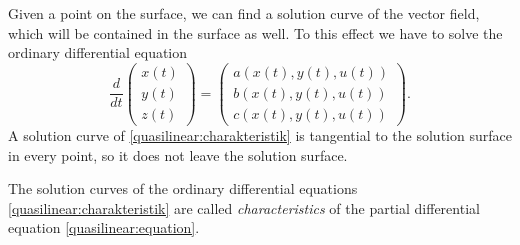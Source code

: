 Given a point on the surface, we can find a solution curve of the vector
field, which will be contained in the surface as well.
To this effect we have to solve the ordinary differential equation
\begin{equation}
\frac{d}{dt}\begin{pmatrix}x(t)\\y(t)\\z(t)\end{pmatrix}
=
\begin{pmatrix}
a(x(t),y(t),u(t))\\b(x(t),y(t),u(t))\\c(x(t),y(t),u(t))
\end{pmatrix}.
\label{quasilinear:charakteristik}
\end{equation}
A solution curve of
\eqref{quasilinear:charakteristik}
is tangential to the solution surface in every point, so it does not
leave the solution surface.

\begin{definition}
\label{def:quasiliniear:charakteristik}
The solution curves of the ordinary differential equations
\eqref{quasilinear:charakteristik} are called {\em characteristics}
of the partial differential equation \eqref{quasilinear:equation}.
\end{definition}

